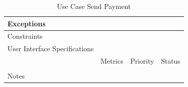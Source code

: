 \begin{table}[H]
\begin{tabularx}{\linewidth}{|l|X|X|X|}
            \hline Exceptions                    & \multicolumn{3}{l|}{}                                                                                 \\

            \hline Constraints                   & \multicolumn{3}{l|}{}                                                                                 \\

            \hline User Interface Specifications & \multicolumn{3}{l|}{}                                                                                 \\

            \hline \multirow{2}{*}{}             & Metrics                                                                           & Priority & Status \\
            \cline{2-4}                          &                                                                                   &          &        \\
            \hline Notes                         & \multicolumn{3}{l|}{}                                                                                 \\
            \hline
      \end{tabularx}
      \caption{Use Case Send Payment}
      \label{tab:use_case_send_payment}
\end{table}

